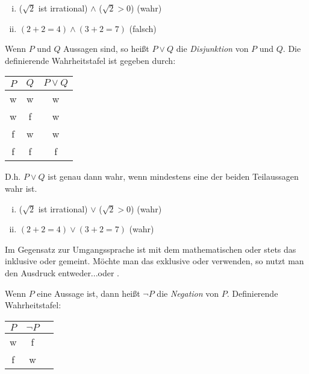 \begin{example}
    \begin{enumerate}[(i)]
        \item
        ($\sqrt{2}$ ist irrational) $\wedge$ ($\sqrt{2} > 0$) (wahr)
        \item
        $(2 + 2 = 4) \wedge (3 + 2 = 7)$ (falsch)
    \end{enumerate}
\end{example}

\begin{mydef}
    Wenn $P$ und $Q$ Aussagen sind, so heißt $P \vee Q$ die \textit{Disjunktion} von $P$ und $Q$.
    Die definierende Wahrheitstafel ist gegeben durch: \newline
    \begin{tabular}{ c | c | c }
        $P$ & $Q$ & $P \vee Q$ \\
        \hline
        w & w & w \\
        w & f & w \\
        f & w & w \\
        f & f & f \\
    \end{tabular}
    \newline 
    D.h. $P \vee Q$ ist genau dann wahr, wenn mindestens eine der beiden Teilaussagen wahr ist.
\end{mydef}

\begin{example}
    \begin{enumerate}[(i)]
        \item
        ($\sqrt{2}$ ist irrational) $\vee$ ($\sqrt{2} > 0$) (wahr)
        \item
        $(2 + 2 = 4) \vee (3 + 2 = 7)$ (wahr)
    \end{enumerate}
\end{example}

\begin{remark}
    Im Gegensatz zur Umgangssprache ist mit dem mathematischen oder stets das inklusive oder gemeint.
    Möchte man das exklusive oder verwenden, so nutzt man den Ausdruck \glqq entweder...oder \grqq.
\end{remark}

\begin{mydef}
    Wenn $P$ eine Aussage ist, dann heißt $\neg P$ die \textit{Negation} von $P$.
    Definierende Wahrheitstafel: \newline
    \begin{tabular}{ c | c | c }
        $P$ &  $\neg P$ \\
        \hline
        w & f  \\
        f & w  \\
    \end{tabular}
\end{mydef}


